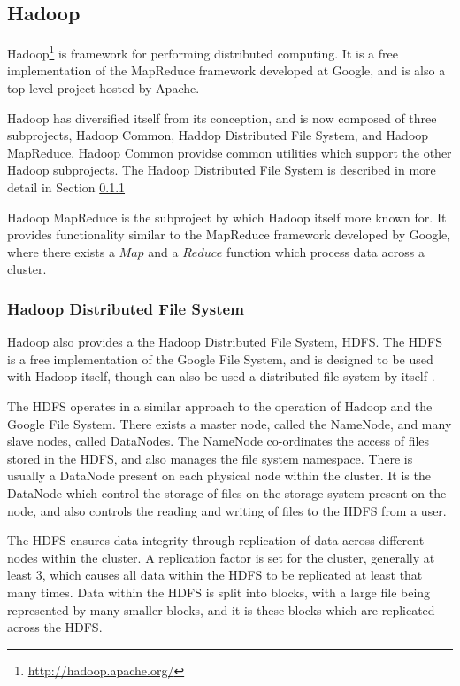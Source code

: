 \subsection{Hadoop}
Hadoop\footnote{\url{http://hadoop.apache.org/}} is framework for performing
distributed computing. It is a free implementation of the MapReduce framework
developed at Google, and is also a top-level project hosted by Apache.

Hadoop has diversified itself from its conception, and is now composed of three
subprojects, Hadoop Common, Haddop Distributed File System, and Hadoop
MapReduce. Hadoop Common providse common utilities which support the other
Hadoop subprojects. The Hadoop Distributed File System is described in more
detail in Section \ref{sec:hdfs}

Hadoop MapReduce is the subproject by which Hadoop itself more known for. It
provides functionality similar to the MapReduce framework developed by Google,
where there exists a $Map$ and a $Reduce$ function which process data across a
cluster.

\subsubsection{Hadoop Distributed File System}
\label{sec:hdfs}
Hadoop also provides a the Hadoop Distributed File System, HDFS. The HDFS is a free implementation of the Google File System, and is designed to be used with Hadoop itself, though can also be used a distributed file system by itself \cite{hdfs}.

The HDFS operates in a similar approach to the operation of Hadoop and the Google File System. There exists a master node, called the NameNode, and many slave nodes, called DataNodes. The NameNode co-ordinates the access of files stored in the HDFS, and also manages the file system namespace. There is usually a DataNode present on each physical node within the cluster. It is the DataNode which control the storage of files on the storage system present on the node, and also controls the reading and writing of files to the HDFS from a user.

The HDFS ensures data integrity through replication of data across different nodes within the cluster. A replication factor is set for the cluster, generally at least 3, which causes all data within the HDFS to be replicated at least that many times. Data within the HDFS is split into blocks, with a large file being represented by many smaller blocks, and it is these blocks which are replicated across the HDFS.

